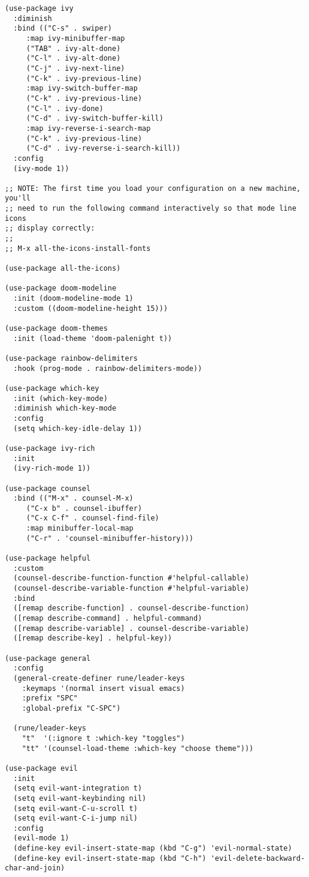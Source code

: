 \documentclass[11pt]{article}
\begin{document}
\begin{verbatim}
(use-package ivy
  :diminish
  :bind (("C-s" . swiper)
	 :map ivy-minibuffer-map
	 ("TAB" . ivy-alt-done)
	 ("C-l" . ivy-alt-done)
	 ("C-j" . ivy-next-line)
	 ("C-k" . ivy-previous-line)
	 :map ivy-switch-buffer-map
	 ("C-k" . ivy-previous-line)
	 ("C-l" . ivy-done)
	 ("C-d" . ivy-switch-buffer-kill)
	 :map ivy-reverse-i-search-map
	 ("C-k" . ivy-previous-line)
	 ("C-d" . ivy-reverse-i-search-kill))
  :config
  (ivy-mode 1))

;; NOTE: The first time you load your configuration on a new machine, you'll
;; need to run the following command interactively so that mode line icons
;; display correctly:
;;
;; M-x all-the-icons-install-fonts

(use-package all-the-icons)

(use-package doom-modeline
  :init (doom-modeline-mode 1)
  :custom ((doom-modeline-height 15)))

(use-package doom-themes
  :init (load-theme 'doom-palenight t))

(use-package rainbow-delimiters
  :hook (prog-mode . rainbow-delimiters-mode))

(use-package which-key
  :init (which-key-mode)
  :diminish which-key-mode
  :config
  (setq which-key-idle-delay 1))

(use-package ivy-rich
  :init
  (ivy-rich-mode 1))

(use-package counsel
  :bind (("M-x" . counsel-M-x)
	 ("C-x b" . counsel-ibuffer)
	 ("C-x C-f" . counsel-find-file)
	 :map minibuffer-local-map
	 ("C-r" . 'counsel-minibuffer-history)))

(use-package helpful
  :custom
  (counsel-describe-function-function #'helpful-callable)
  (counsel-describe-variable-function #'helpful-variable)
  :bind
  ([remap describe-function] . counsel-describe-function)
  ([remap describe-command] . helpful-command)
  ([remap describe-variable] . counsel-describe-variable)
  ([remap describe-key] . helpful-key))

(use-package general
  :config
  (general-create-definer rune/leader-keys
    :keymaps '(normal insert visual emacs)
    :prefix "SPC"
    :global-prefix "C-SPC")

  (rune/leader-keys
    "t"  '(:ignore t :which-key "toggles")
    "tt" '(counsel-load-theme :which-key "choose theme")))

(use-package evil
  :init
  (setq evil-want-integration t)
  (setq evil-want-keybinding nil)
  (setq evil-want-C-u-scroll t)
  (setq evil-want-C-i-jump nil)
  :config
  (evil-mode 1)
  (define-key evil-insert-state-map (kbd "C-g") 'evil-normal-state)
  (define-key evil-insert-state-map (kbd "C-h") 'evil-delete-backward-char-and-join)


\end{verbatim}
\end{document}
